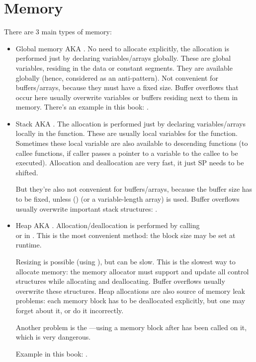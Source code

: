 ﻿\section{Memory}

There are 3 main types of memory:

\begin{itemize}
\item
Global memory \ac{AKA} .
No need to allocate explicitly, the allocation is performed just by declaring variables/arrays 
globally.
These are global variables, residing in the data or constant segments.
They are available globally (hence, considered as an \gls{anti-pattern}).
Not convenient for buffers/arrays, because they must have a fixed size.
Buffer overflows that occur here usually overwrite variables or buffers residing next to them in memory.
There's an example in this book: .

\item
Stack \ac{AKA} .
The allocation is performed just by declaring variables/arrays locally in the function.
These are usually local variables for the function.
Sometimes these local variable are also available to descending functions 
(to \gls{callee} functions, if caller passes a pointer to a variable to the \gls{callee} to be executed).
Allocation and deallocation are very fast, it just \ac{SP} needs to be shifted.

But they're also not convenient for buffers/arrays, because the buffer size has to be fixed,
unless  () (or a variable-length array) is used.
Buffer overflows usually overwrite important stack structures: .

\item
Heap \ac{AKA} .
Allocation/deallocation is performed by calling \\
 or  in \Cpp.
This is the most convenient method: the block size may be set at runtime.

Resizing is possible (using ), but can be slow.
This is the slowest way to allocate memory: 
the memory allocator must support and update all control structures while
allocating and deallocating.
Buffer overflows usually overwrite these structures.
Heap allocations are also source of memory leak problems: each memory block has to be deallocated
explicitly, but one may forget about it, or do it incorrectly.

Another problem is the ---using a memory block after  has been called on it,
which is very dangerous.

Example in this book: .

\end{itemize}
